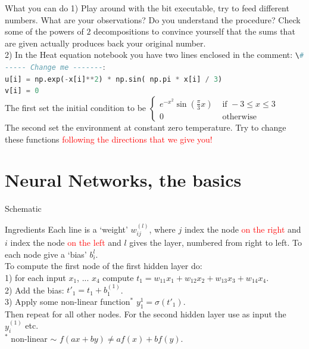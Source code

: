 \documentclass[10pt]{beamer}
\newcommand{\red}[1]{\textcolor{red}{#1}}
\newcommand{\ta}{\left(}
\newcommand{\tc}{\right)}
\renewcommand{\[}{\begin{equation*}}
\renewcommand{\]}{\end{equation*}}
\begin{document}
\begin{frame}{What you can do}
1) Play around with the bit executable, try to feed different numbers. What are your observations? Do you understand the procedure? Check some of the powers of $2$ decompositions to convince yourself that the sums that are given actually produces back your original number.\\
2) In the Heat equation notebook you have two lines enclosed in the comment: \lstinline[language=Python]{\# ----- Change me -------}:\\
\lstinline[language=Python]{u[i] = np.exp(-x[i]**2) * np.sin( np.pi * x[i] / 3)}\\
\lstinline[language=Python]{v[i] = 0}\\
The first set the initial condition to be 
$
\begin{cases}
e^{-x^2}\sin\ta\frac{\pi}{3}x\tc & \text{ if } -3\le x\le 3\\
0 & \text{ otherwise }
\end{cases}
$\\
The second set the environment at constant zero temperature. 
Try to change these functions \red{following the directions that we give you!}



\end{frame}

\section{Neural Networks, the basics}

\begin{frame}{Schematic}
\begin{figure}
    \centering
    
\end{figure}
\end{frame}

\begin{frame}{Ingredients}
Each line is a `weight' $w^{(l)}_{ij}$, where $j$ index the node \red{on the right} and $i$ index the node \red{on the left} and $l$ gives the layer, numbered from right to left. To each node give a `bias' $b^{l}_i$.\\
To compute the first node of the first hidden layer do:\\
1) for each input $x_1$, ... $x_4$ compute $t_1 = w_{11}x_1+w_{12}x_2+w_{13}x_3+w_{14}x_4$.\\
2) Add the bias: $t'_1 = t_1 + b^{(1)}_1 $.\\
3) Apply some non-linear function$^*$ $y^{1}_1 = \sigma(t'_1)$.\\

Then repeat for all other nodes. For the second hidden layer use as input the $y^(1)_i$ etc.\\

$^*$ non-linear $\sim$ $f(a x+ by)\neq af(x)+bf(y)$.
\end{frame}
\end{document}
